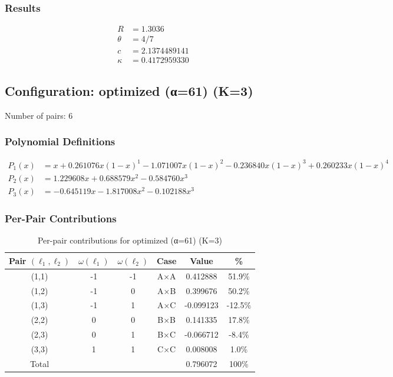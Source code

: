 \subsubsection{Results}
\begin{align*}
R &= 1.3036 \\
\theta &= 4/7 \\
c &= 2.1374489141 \\
\kappa &= 0.4172959330
\end{align*}

\newpage
\subsection{Configuration: optimized (α=61) (K=3)}

Number of pairs: 6

\subsubsection{Polynomial Definitions}
\begin{align*}
P_1(x) &= x + 0.261076 x(1-x)^{1} - 1.071007 x(1-x)^{2} - 0.236840 x(1-x)^{3} + 0.260233 x(1-x)^{4} \\
P_2(x) &= 1.229608 x + 0.688579 x^{2} - 0.584760 x^{3} \\
P_3(x) &= -0.645119 x - 1.817008 x^{2} - 0.102188 x^{3}
\end{align*}

\subsubsection{Per-Pair Contributions}
\begin{table}[h]
\centering
\caption{Per-pair contributions for optimized (α=61) (K=3)}
\begin{tabular}{cccccc}
\hline
Pair $(\ell_1,\ell_2)$ & $\omega(\ell_1)$ & $\omega(\ell_2)$ & Case & Value & \% \\
\hline
(1,1) & -1 & -1 & A×A & 0.412888 & 51.9\% \\
(1,2) & -1 & 0 & A×B & 0.399676 & 50.2\% \\
(1,3) & -1 & 1 & A×C & -0.099123 & -12.5\% \\
(2,2) & 0 & 0 & B×B & 0.141335 & 17.8\% \\
(2,3) & 0 & 1 & B×C & -0.066712 & -8.4\% \\
(3,3) & 1 & 1 & C×C & 0.008008 & 1.0\% \\
\hline
Total & & & & 0.796072 & 100\% \\
\hline
\end{tabular}
\end{table}

